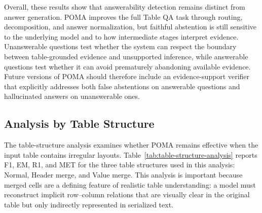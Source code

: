 \documentclass[]{interact}
\begin{document}
Overall, these results show that answerability detection remains distinct from answer generation. POMA improves the full Table QA task through routing, decomposition, and answer normalization, but faithful abstention is still sensitive to the underlying model and to how intermediate stages interpret evidence. Unanswerable questions test whether the system can respect the boundary between table-grounded evidence and unsupported inference, while answerable questions test whether it can avoid prematurely abandoning available evidence. Future versions of POMA should therefore include an evidence-support verifier that explicitly addresses both false abstentions on answerable questions and hallucinated answers on unanswerable ones.

\subsection{Analysis by Table Structure}

The table-structure analysis examines whether POMA remains effective when the input table contains irregular layouts. Table~\ref{tab:table-structure-analysis} reports F1, EM, R1, and MET for the three table structures used in this analysis: Normal, Header merge, and Value merge. This analysis is important because merged cells are a defining feature of realistic table understanding: a model must reconstruct implicit row--column relations that are visually clear in the original table but only indirectly represented in serialized text.
\end{document}
